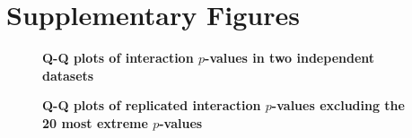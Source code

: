\documentclass{article}
\begin{document}
\clearpage
\section{Supplementary Figures}
\makeatletter 
\renewcommand{\thefigure}{S\@arabic\c@figure} 

\begin{figure}
\caption{\textbf{Q-Q plots of interaction $p$-values in two independent datasets}}
\label{fig:qqplotbonf}
\end{figure}

\begin{figure}
\caption{\textbf{Q-Q plots of replicated interaction $p$-values excluding the 20 most extreme $p$-values}}
\label{fig:qqplotfdr}
\end{figure}
\end{document}
